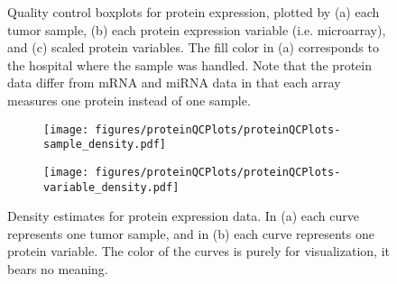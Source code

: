 \begin{figure}
	\centering
	\begin{subfigure}{1\textwidth}
		\centering
	\end{subfigure}
	\begin{subfigure}{1\textwidth}
		\centering
	\end{subfigure}
	\begin{subfigure}{1\textwidth}
		\centering
	\end{subfigure}

	\caption{Quality control boxplots for protein expression, plotted by
	(a) each tumor sample,
	(b) each protein expression variable (i.e. microarray), 
	and (c) scaled protein variables.
	The fill color in (a) corresponds to the hospital where the sample was handled. Note that
	the protein data differ from mRNA and miRNA data in that each array measures one protein instead of one sample.}
	\label{fig:qc-protein-boxplot}
\end{figure}


\begin{figure}[!h]
	\centering
	\begin{subfigure}{.49\textwidth}
		\texttt{[image: figures/proteinQCPlots/proteinQCPlots-sample\_density.pdf]}
	\end{subfigure}
	\begin{subfigure}{.49\textwidth}
		\texttt{[image: figures/proteinQCPlots/proteinQCPlots-variable\_density.pdf]}
	\end{subfigure}

	\caption{Density estimates for protein expression data. In (a) each curve represents one tumor sample,
	and in (b) each curve represents one protein variable. The color of the curves is purely for visualization,
	it bears no meaning.}
	\label{fig:qc-protein-density}
\end{figure}


